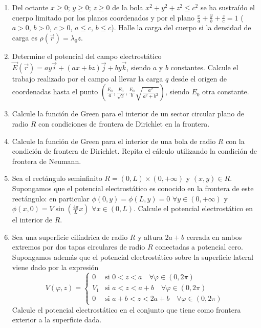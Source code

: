 \documentclass[12pt,a4paper]{book}
\begin{document}
\begin{enumerate}
\item Del octante $x \geq 0$; $y \geq 0$; $z \geq 0$ de la bola $x^2 + y^2 + z^2 \leq c^2$ se ha sustraído el cuerpo limitado por los planos coordenados y por el plano $\frac{x}{a} + \frac{y}{b} + \frac{z}{c} = 1$ ($a > 0$, $b > 0$, $c > 0$, $a \leq c$, $b \leq c$). Halle la carga del cuerpo si la densidad de carga es $\rho(\vec{r}) = \lambda_0 z$.

\item Determine el potencial del campo electrostático $\vec{E}(\vec{r}) = ay\vec{i} + (ax + bz)\vec{j} + by\vec{k}$, siendo $a$ y $b$ constantes. Calcule el trabajo realizado por el campo al llevar la carga $q$ desde el origen de coordenadas hasta el punto $\left(\frac{E_0}{a}, \frac{E_0}{\sqrt{2}}, \frac{E_0}{b}\sqrt{\frac{a^2}{a^2+b^2}}\right)$, siendo $E_0$ otra constante.

\item Calcule la función de Green para el interior de un sector circular plano de radio $R$ con condiciones de frontera de Dirichlet en la frontera.

\item Calcule la función de Green para el interior de una bola de radio $R$ con la condición de frontera de Dirichlet. Repita el cálculo utilizando la condición de frontera de Neumann.

\item Sea el rectángulo seminfinito $R = (0, L) \times (0, +\infty)$ y $(x, y) \in R$. Supongamos que el potencial electrostático es conocido en la frontera de este rectángulo: en particular $\phi(0, y) = \phi(L, y) = 0$ $\forall y \in (0, +\infty)$ y $\phi(x, 0) = V\sin\left(\frac{4\pi}{L}x\right)$ $\forall x \in (0, L)$. Calcule el potencial electrostático en el interior de $R$.

\item Sea una superficie cilíndrica de radio $R$ y altura $2a + b$ cerrada en ambos extremos por dos tapas circulares de radio $R$ conectadas a potencial cero. Supongamos además que el potencial electrostático sobre la superficie lateral viene dado por la expresión
\begin{equation*}
V(\varphi, z) = 
\begin{cases}
0 & \text{si } 0 < z < a \quad \forall \varphi \in (0, 2\pi) \\
V_1 & \text{si } a < z < a + b \quad \forall \varphi \in (0, 2\pi) \\
0 & \text{si } a + b < z < 2a + b \quad \forall \varphi \in (0, 2\pi)
\end{cases}
\end{equation*}
Calcule el potencial electrostático en el conjunto que tiene como frontera exterior a la superficie dada.


\end{enumerate}
\end{document}
